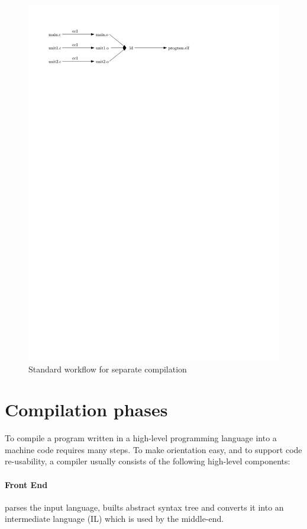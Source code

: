 \begin{figure}[!ht]
\centering
\includegraphics{./img/non-lto-workflow.pdf}
\caption{Standard workflow for separate compilation}
\label{figure-non-lto-workflow}
\end{figure}


\section{Compilation phases}

To compile a program written in a high-level programming language into a machine
code requires many steps. To make orientation easy, and to support code
re-usability, a compiler usually consists of the following high-level components:

\paragraph{Front End} parses the input language, builts abstract syntax
tree and converts it into an intermediate language (IL) which is used by the
middle-end.

